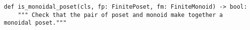 \begin{verbatim}
def is_monoidal_poset(cls, fp: FinitePoset, fm: FiniteMonoid) -> bool:
    """ Check that the pair of poset and monoid make together a monoidal poset."""
\end{verbatim}